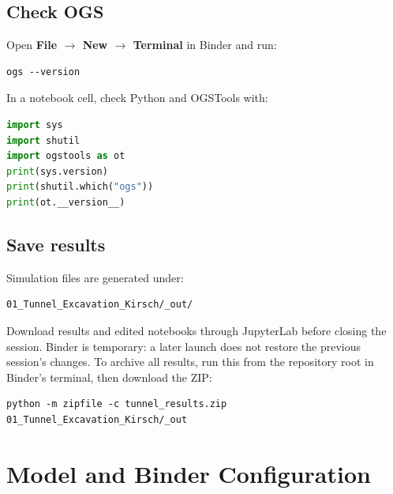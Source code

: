\documentclass[11pt,a4paper]{tubaf-report}
\begin{document}
\section{Check OGS}
Open \textbf{File $\rightarrow$ New $\rightarrow$ Terminal} in Binder and run:
\begin{lstlisting}
ogs --version
\end{lstlisting}
In a notebook cell, check Python and OGSTools with:
\begin{lstlisting}[language=Python]
import sys
import shutil
import ogstools as ot
print(sys.version)
print(shutil.which("ogs"))
print(ot.__version__)
\end{lstlisting}
\section{Save results}
Simulation files are generated under:
\begin{lstlisting}
01_Tunnel_Excavation_Kirsch/_out/
\end{lstlisting}
Download results and edited notebooks through JupyterLab before closing the session. Binder is temporary: a later launch does not restore the previous session's changes. To archive all results, run this from the repository root in Binder's terminal, then download the ZIP:
\begin{lstlisting}
python -m zipfile -c tunnel_results.zip 01_Tunnel_Excavation_Kirsch/_out
\end{lstlisting}
\chapter{Model and Binder Configuration}
\end{document}
